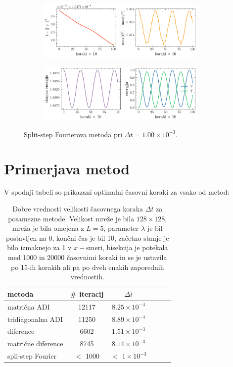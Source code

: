 \documentclass[11pt]{report}
\begin{document}
\begin{figure}[h!]
	\centering
	\begin{subfigure}[b]{\textwidth}
		\centering
		\includegraphics[width=0.9\textwidth]{norm_max_ssfm.pdf}
		\label{fig: < >}
	\end{subfigure}
	\hfill
	\begin{subfigure}[b]{1\textwidth}
		\centering
		\includegraphics[width=0.9\textwidth]{E_ssfm.pdf}
		\label{fig: < >}
	\end{subfigure}
	\caption{Split-step Fourierova metoda pri $\Delta t = 1.00 \times 10^{-3}$.}
	\label{fig: 7}
\end{figure}

\section{Primerjava metod}
V spodnji tabeli so prikazani optimalni časovni koraki za vsako od metod:
\begin{table}[h!]
	\begin{center}
		\begin{tabular}{l|ccccc}
			metoda                    & \# iteracij & $\Delta t$             \\
			\hline matrična ADI       & 12117       & $8.25 \times 10^{-4}$  \\
			\hline tridiagonalna ADI  & 11250       & $8.89 \times 10^{-4}$  \\
			\hline diference          & 6602        & $1.51 \times 10^{-3}$  \\
			\hline matrične diference & 8745        & $8.14 \times 10^{-3}$  \\
			\hline spli-step Fourier  & $<$ 1000    & $<$ $1 \times 10^{-3}$ \\
		\end{tabular}
	\end{center}
	\caption{Dobre vrednosti velikosti časovnega koraka $\Delta t$ za posamezne metode. Velikost mreže je bila
		$128 \times 128$, mreža je bila omejena z $L=5$, parameter $\lambda$ je bil postavljen na 0, končni čas
		je bil 10, začetno stanje je bilo izmaknejo za 1 v $x-$smeri, bisekcija je potekala med 1000 in 20000
		časovnimi koraki in se je ustavila po 15-ih korakih ali pa po dveh enakih zaporednih vrednostih.}
	\label{tab: 1}
\end{table}
\end{document}
